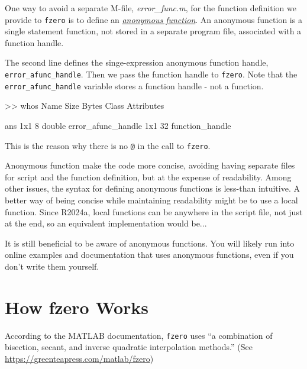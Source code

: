 One way to avoid a separate M-file, \emph{error\_func.m}, for the function definition we provide to \lstinline{fzero} is to define an 
\href{https://www.mathworks.com/help/matlab/matlab_prog/anonymous-functions.html}{\emph{anonymous function}}.  
An anonymous function is a single statement function, not stored in a separate program file, associated with a function handle.  



The second line defines the singe-expression anonymous function handle, \lstinline{error_afunc_handle}.  Then we pass the function handle to \lstinline{fzero}.  Note that the \lstinline{error_afunc_handle} variable stores a function handle - not a function.
\begin{code}
    >> whos
  Name                    Size            Bytes  Class              Attributes

  ans                     1x1                 8  double                       
  error_afunc_handle      1x1                32  function_handle    
\end{code}
This is the reason why there is no \lstinline{@} in the call to \lstinline{fzero}.

Anonymous function make the code more concise, avoiding having separate files for script and the function definition, but at the expense of readability.  Among other issues, the syntax for defining anonymous functions is less-than intuitive.  A better way of being concise while maintaining readability might be to use a local function.  Since R2024a, local functions can be anywhere in the script file, not just at the end, so an equivalent implementation would be...



It is still beneficial to be aware of anonymous functions.  You will likely run into online examples and documentation that uses anonymous functions, even if you don't write them yourself.

\section{How fzero Works}
\label{howfzero}

According to the MATLAB documentation, \lstinline{fzero} uses ``a combination of bisection, secant, and inverse quadratic interpolation methods.''  (See \url{https://greenteapress.com/matlab/fzero})

